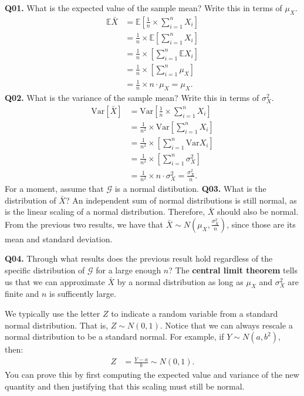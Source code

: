 \documentclass[12pt]{article}
\newcommand{\E}{\mathbb{E}}
\newcommand{\V}{\text{Var}}
\newcommand{\cblack}{\color{Black}}
\newcommand{\cblue}{\color{MidnightBlue}}
\begin{document}
\textbf{Q01.} What is the expected value of the sample mean? Write this in terms
of $\mu_X$. \cblue
\begin{align*}
\E \bar{X} &= \E \left[ \frac{1}{n} \times \sum_{i=1}^n X_i \right] \\
&= \frac{1}{n} \times \E \left[ \sum_{i=1}^n X_i \right] \\
&= \frac{1}{n} \times \left[ \sum_{i=1}^n \E X_i \right] \\
&= \frac{1}{n} \times \left[ \sum_{i=1}^n \mu_X \right] \\
&= \frac{1}{n} \times n \cdot \mu_X = \mu_X.
\end{align*}
\cblack \textbf{Q02.} What is the variance of the sample mean? Write this
in terms of $\sigma_X^2$. \cblue
\begin{align*}
\V [\bar{X}] &= \V \left[ \frac{1}{n} \times \sum_{i=1}^n X_i \right] \\
&= \frac{1}{n^2} \times \V \left[ \sum_{i=1}^n X_i \right] \\
&= \frac{1}{n^2} \times \left[ \sum_{i=1}^n \V X_i \right] \\
&= \frac{1}{n^2} \times \left[ \sum_{i=1}^n \sigma_X^2 \right] \\
&= \frac{1}{n^2} \times n \cdot \sigma_X^2 = \frac{\sigma_X^2}{n}.
\end{align*}
\cblack For a moment, assume that $\mathcal{G}$ is a normal distibution.
\textbf{Q03.} What is the distribution of $\bar{X}$? \cblue An independent sum of
normal distributions is still normal, as is the linear scaling of a normal
distribution. Therefore, $\bar{X}$ should also be normal. From the previous
two results, we have that $\bar{X} \sim N(\mu_X, \frac{\sigma_X^2}{n})$,
since those are its mean and standard deviation.

\cblack \textbf{Q04.} Through what results does the previous result hold regardless
of the specific distribution of $\mathcal{G}$ for a large enough $n$? \cblue
The \textbf{central limit theorem} tells us that we can approximate $\bar{X}$
by a normal distribution as long as $\mu_X$ and $\sigma^2_X$ are finite and $n$
is sufficently large.

\cblack We typically use the letter $Z$ to indicate a random variable from a
standard normal distribution. That is, $Z \sim N(0, 1)$. Notice that we can
always rescale a normal distribution to be a standard normal. For example, if
$Y \sim N(a, b^2)$, then:
\begin{align*}
Z &= \frac{Y - a}{b} \sim N(0, 1).
\end{align*} 
You can prove this by first computing the expected value and variance of the
new quantity and then justifying that this scaling must still be normal.
\end{document}
